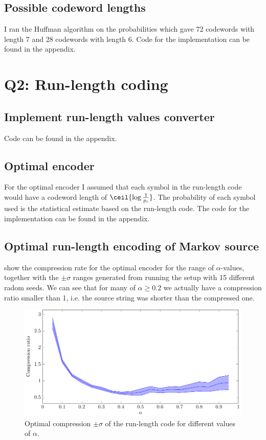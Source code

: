 \documentclass{article}
\begin{document}
\subsection{Possible codeword lengths}
I ran the Huffman algorithm on the probabilities which gave
72 codewords with length 7 
and 28 codewords with length 6.
Code for the implementation can be found in the appendix.

\section{Q2: Run-length coding}

\subsection{Implement run-length values converter}
Code can be found in the appendix.

\subsection{Optimal encoder}
For the optimal encoder I assumed that each symbol in the run-length code would have
a codeword length of $\ceil{\log \frac{1}{p_i}}$.
The probability of each symbol used is the statistical estimate based on the run-length code.
The code for the implementation can be found in the appendix.

\subsection{Optimal run-length encoding of Markov source}
 show the compression rate for the optimal encoder for the range of $\alpha$-values,
together with the $\pm\sigma$ ranges generated from running the setup with 15 different radom seeds.
We can see that for many of $\alpha \geq 0.2$ we actually have a compression ratio smaller than 1,
i.e. the source string was shorter than the compressed one.

\begin{figure}[!ht]
  \centering
  \includegraphics{../tikz/compression_optimal/optimal_run_length.pdf}
  \caption{Optimal compression $\pm\sigma$ of the run-length code for different values of $\alpha$.}
  \label{fig:optimalcompr}
\end{figure}
\end{document}
